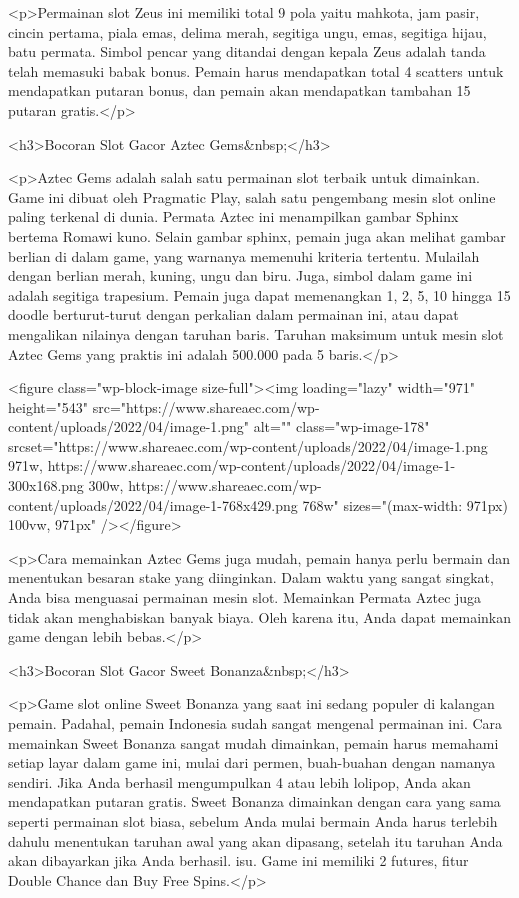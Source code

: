{<p>Permainan slot Zeus ini memiliki total 9 pola yaitu mahkota, jam pasir, cincin pertama, piala emas, delima merah, segitiga ungu, emas, segitiga hijau, batu permata. Simbol pencar yang ditandai dengan kepala Zeus adalah tanda telah memasuki babak bonus. Pemain harus mendapatkan total 4 scatters untuk mendapatkan putaran bonus, dan pemain akan mendapatkan tambahan 15 putaran gratis.</p>



<h3>Bocoran Slot Gacor Aztec Gems&nbsp;</h3>



<p>Aztec Gems adalah salah satu permainan slot terbaik untuk dimainkan. Game ini dibuat oleh Pragmatic Play, salah satu pengembang mesin slot online paling terkenal di dunia. Permata Aztec ini menampilkan gambar Sphinx bertema Romawi kuno. Selain gambar sphinx, pemain juga akan melihat gambar berlian di dalam game, yang warnanya memenuhi kriteria tertentu. Mulailah dengan berlian merah, kuning, ungu dan biru. Juga, simbol dalam game ini adalah segitiga trapesium. Pemain juga dapat memenangkan 1, 2, 5, 10 hingga 15 doodle berturut-turut dengan perkalian dalam permainan ini, atau dapat mengalikan nilainya dengan taruhan baris. Taruhan maksimum untuk mesin slot Aztec Gems yang praktis ini adalah 500.000 pada 5 baris.</p>



<figure class="wp-block-image size-full"><img loading="lazy" width="971" height="543" src="https://www.shareaec.com/wp-content/uploads/2022/04/image-1.png" alt="" class="wp-image-178" srcset="https://www.shareaec.com/wp-content/uploads/2022/04/image-1.png 971w, https://www.shareaec.com/wp-content/uploads/2022/04/image-1-300x168.png 300w, https://www.shareaec.com/wp-content/uploads/2022/04/image-1-768x429.png 768w" sizes="(max-width: 971px) 100vw, 971px" /></figure>



<p>Cara memainkan Aztec Gems juga mudah, pemain hanya perlu bermain dan menentukan besaran stake yang diinginkan. Dalam waktu yang sangat singkat, Anda bisa menguasai permainan mesin slot. Memainkan Permata Aztec juga tidak akan menghabiskan banyak biaya. Oleh karena itu, Anda dapat memainkan game dengan lebih bebas.</p>



<h3>Bocoran Slot Gacor Sweet Bonanza&nbsp;</h3>



<p>Game slot online Sweet Bonanza yang saat ini sedang populer di kalangan pemain. Padahal, pemain Indonesia sudah sangat mengenal permainan ini. Cara memainkan Sweet Bonanza sangat mudah dimainkan, pemain harus memahami setiap layar dalam game ini, mulai dari permen, buah-buahan dengan namanya sendiri. Jika Anda berhasil mengumpulkan 4 atau lebih lolipop, Anda akan mendapatkan putaran gratis. Sweet Bonanza dimainkan dengan cara yang sama seperti permainan slot biasa, sebelum Anda mulai bermain Anda harus terlebih dahulu menentukan taruhan awal yang akan dipasang, setelah itu taruhan Anda akan dibayarkan jika Anda berhasil. isu. Game ini memiliki 2 futures, fitur Double Chance dan Buy Free Spins.</p>



}
